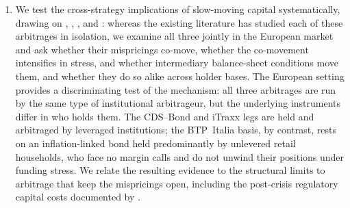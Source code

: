 \begin{enumerate}[label=\textbf{\arabic*.}, leftmargin=*, itemsep=4pt]
\item We test the cross-strategy implications of slow-moving capital
  systematically, drawing on \citet{duffie2010presidential},
  \citet{brunnermeier2009market}, \citet{mitchell2012arbitrage}, and
  \citet{fleckenstein2014tips}: whereas the existing literature has
  studied each of these arbitrages in isolation, we examine all three
  jointly in the European market and ask whether their mispricings
  co-move, whether the co-movement intensifies in stress, and whether
  intermediary balance-sheet conditions move them, and whether they do
  so alike across holder bases. The European setting
  provides a discriminating test of the mechanism: all three
  arbitrages are run by the same type of institutional arbitrageur,
  but the underlying instruments differ in who holds them. The
  CDS--Bond and iTraxx legs are held and arbitraged by leveraged
  institutions; the BTP~Italia basis, by contrast, rests on an
  inflation-linked bond held predominantly by unlevered retail
  households, who face no margin calls and do not unwind their
  positions under funding stress. We relate the resulting evidence to
  the structural limits to arbitrage that keep the mispricings open,
  including the post-crisis regulatory capital costs documented by
  \citet{boyarchenko2016trends}.

\end{enumerate}


